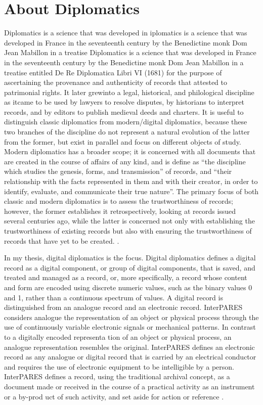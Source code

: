 \section{About Diplomatics}
Diplomatics is a science that was developed in iplomatics is a science that was developed in France in the seventeenth century by the Benedictine
monk Dom Jean Mabillon in a treatise Diplomatics is a science that was developed in France in the seventeenth century by the Benedictine monk Dom Jean Mabillon in a treatise entitled De Re Diplomatica Libri VI (1681) for the purpose of ascertaining the provenance and authenticity of records
that attested to patrimonial rights. It later grewinto a legal, historical, and philological discipline as itcame to be used by lawyers to resolve disputes, by historians to interpret records, and by editors to publish medieval deeds and charters. It is useful to distinguish classic diplomatics from modern/digital diplomatics, because these two branches of the discipline do not represent a natural evolution of the latter from the former, but exist in parallel and focus on different objects of study. Modern diplomatics has a broader scope; it is concerned with all documents that are created in the course of affairs of any kind, and is define as “the discipline which studies the genesis, forms, and transmission” of records, and “their relationship with the facts represented in them and with their creator, in order to identify, evaluate, and communicate their true nature”. The primary focus of both classic and modern diplomatics is to assess the trustworthiness of records; however, the former establishes it retrospectively, looking at records issued several centuries ago, while the latter is concerned not only with establishing the trustworthiness of existing records but also with ensuring the trustworthiness of records that have yet to be created. \cite[10]{kirschenbaum2010digital}. 

In my thesis, digital diplomatics is the focus.
Digital diplomatics defines a digital record as a digital component, or group of digital components, that is saved, and treated and managed as a record, or, more specifically, a record whose content and form are encoded using discrete numeric values, such as the binary values 0 and 1, rather than a continuous spectrum of values. A digital record is distinguished from an analogue record and an electronic record. InterPARES considers analogue the representation of an object or physical process through the use of continuously variable electronic signals or mechanical patterns. In contrast to a digitally encoded representa tion of an object or physical process, an analogue representation resembles the original. InterPARES defines an electronic record as any analogue or digital record that is carried by an electrical conductor and requires the use of electronic equipment to be intelligible by a person. InterPARES defines a record, using the traditional archival concept, as a document made or received in the course of a practical activity as an instrument or a by-prod uct of such activity, and set aside for action or reference \cite[52]{duranti2009digital}.

